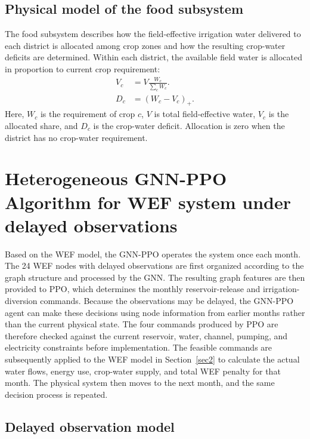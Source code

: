 \documentclass [a4paper,fleqn] {cas-dc}
\begin{document}
\subsection{Physical model of the food subsystem}
\label{sec24}
The food subsystem describes how the field-effective irrigation water delivered to each district is allocated among crop zones and how the resulting crop-water deficits are determined. Within each district, the available field water is allocated in proportion to current crop requirement:
\begin{align}
  V_c&=V\frac{W_c}{\sum_c W_c}.
  \label{eq:crop-water-allocation}\\
  D_c&=\left(W_c-V_c\right)_+.
  \label{eq:crop-water-deficit}
\end{align}
Here, $W_c$ is the requirement of crop $c$, $V$ is total field-effective water, $V_c$ is the allocated share, and $D_c$ is the crop-water deficit. Allocation is zero when the district has no crop-water requirement.

\section{Heterogeneous GNN-PPO Algorithm for WEF system under delayed observations} \label{sec3}

Based on the WEF model, the GNN-PPO operates the system once each month. The 24 WEF nodes with delayed observations are first organized according to the graph structure and processed by the GNN. The resulting graph features are then provided to PPO, which determines the monthly reservoir-release and irrigation-diversion commands. Because the observations may be delayed, the GNN-PPO agent can make these decisions using node information from earlier months rather than the current physical state. The four commands produced by PPO are therefore checked against the current reservoir, water, channel, pumping, and electricity constraints before implementation. The feasible commands are subsequently applied to the WEF model in Section~\ref{sec2} to calculate the actual water flows, energy use, crop-water supply, and total WEF penalty for that month. The physical system then moves to the next month, and the same decision process is repeated.

\subsection{Delayed observation model}
\label{sec31}
\end{document}

